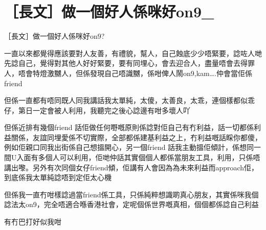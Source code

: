 \chapter{［長文］做一個好人係咪好on9\_}

［長文］做一個好人係咪好on9?

一直以來都覺得應該要對人友善，有禮貌，幫人，自己蝕底少少唔緊要，諗咗人哋先諗自己，覺得對其他人好好緊要，要有同埋心，會去迎合人，盡量唔會去得罪人，唔會特燈激嬲人，但係發現自己唔識嬲，係咁俾人鬧on9,kam….仲會當佢係friend

但係一直都有唔同既人同我講話我太單純，太傻，太善良，太乖，連個樣都似乖仔，第日一定會被人利用，我聽完之後心諗邊有咁多壞人吖

但係近排有幾個friend 話佢做任何嘢嘅原則係諗對佢自己有冇利益，話一切都係利益關係，友誼同埋愛係不切實際，全部都係建基利益之上，冇利益嘅話睬你都傻，例如佢親口同我出街係自己想搵開心，另一個friend 話我主動搵佢傾計，係想同一間U入面有多個人可以利用，佢哋仲話其實個個人都係當朋友工具，利用，只係唔講出嚟。另外有次同個女仔friend傾，佢講有人會因為為未來利益而approach佢，到底係我太單純諗唔到定佢太心機

但係我一直冇咁樣諗過當friend係工具，只係純粹想識啲真心朋友，其實係咪我個諗法太on9，完全唔適合喺香港社會，定呢個係世界嘅真相，個個都係諗自己利益

有冇巴打好似我咁

